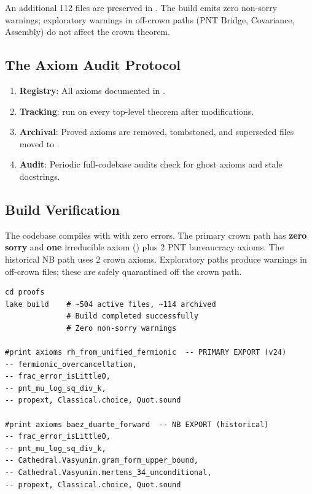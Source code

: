 \documentclass[11pt,a4paper]{article}
\begin{document}
An additional 112 files are preserved in .
The build emits zero non-sorry warnings; exploratory 
warnings in off-crown paths (PNT Bridge, Covariance, Assembly)
do not affect the crown theorem.

\subsection{The Axiom Audit Protocol}

\begin{enumerate}
  \item \textbf{Registry}: All axioms documented in .
  \item \textbf{Tracking}:  run on every
    top-level theorem after modifications.
  \item \textbf{Archival}: Proved axioms are removed, tombstoned,
    and superseded files moved to .
  \item \textbf{Audit}: Periodic full-codebase audits check for
    ghost axioms and stale docstrings.
\end{enumerate}

\subsection{Build Verification}

The codebase compiles with  with zero errors.
The primary crown path has \textbf{zero sorry} and \textbf{one}
irreducible axiom () plus 2 PNT
bureaucracy axioms. The historical NB path uses 2 crown axioms.
Exploratory paths produce  warnings in off-crown files;
these are safely quarantined off the crown path.

\begin{verbatim}
cd proofs
lake build    # ~504 active files, ~114 archived
              # Build completed successfully
              # Zero non-sorry warnings

#print axioms rh_from_unified_fermionic  -- PRIMARY EXPORT (v24)
-- fermionic_overcancellation,
-- frac_error_isLittleO,
-- pnt_mu_log_sq_div_k,
-- propext, Classical.choice, Quot.sound

#print axioms baez_duarte_forward  -- NB EXPORT (historical)
-- frac_error_isLittleO,
-- pnt_mu_log_sq_div_k,
-- Cathedral.Vasyunin.gram_form_upper_bound,
-- Cathedral.Vasyunin.mertens_34_unconditional,
-- propext, Classical.choice, Quot.sound
\end{verbatim}
\end{document}
